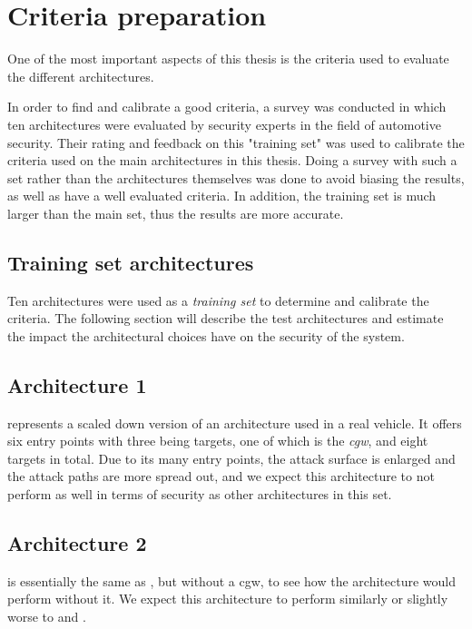 \chapter{Criteria preparation}
\label{chp:introcriteria}

One of the most important aspects of this thesis is the criteria used to evaluate the different architectures.

In order to find and calibrate a good criteria, a survey was conducted in which ten architectures were evaluated by security experts in the field of automotive security.
Their rating and feedback on this "training set" was used to calibrate the criteria used on the main architectures in this thesis.
Doing a survey with such a set rather than the architectures themselves was done to avoid biasing the results, as well as have a well evaluated criteria.
In addition, the training set is much larger than the main set, thus the results are more accurate.

\section{Training set architectures}
\label{sec:trainingarch}

Ten architectures were used as a \textit{training set} to determine and calibrate the criteria.
The following section will describe the test architectures and estimate the impact the architectural choices have on the security of the system.

\section{Architecture 1}
\label{subsec:arch1}

 represents a scaled down version of an architecture used in a real vehicle.
It offers six entry points with three being targets, one of which is the \textit{\acrshort{cgw}}, and eight targets in total.
Due to its many entry points, the attack surface is enlarged and the attack paths are more spread out, 
and we expect this architecture to not perform as well in terms of security as other architectures in this set.

\section{Architecture 2}
\label{subsec:arch2}

 is essentially the same as ,
but without a \acrshort{cgw}, to see how the architecture would perform without it.
We expect this architecture to perform similarly or slightly worse to  and .

